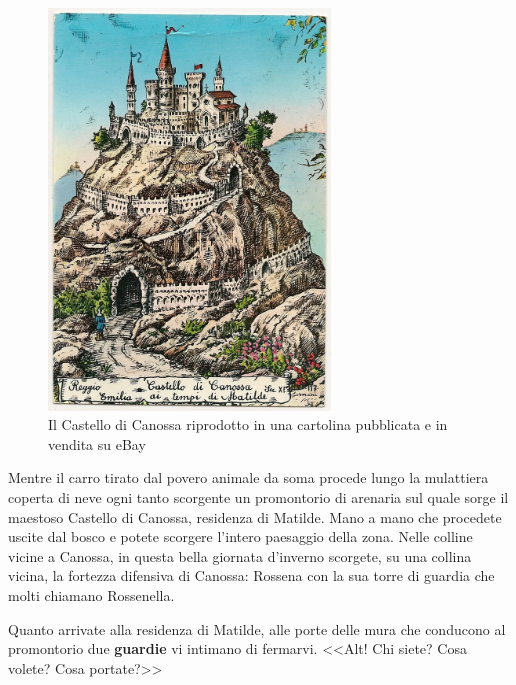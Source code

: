 \documentclass[letterpaper,twocolumn,openany,nodeprecatedcode]{dndbook}
\begin{document}
\begin{figure}
\centering
\includegraphics[width=7.5cm]{img/castello.png}
\caption{Il Castello di Canossa riprodotto in una cartolina pubblicata e in vendita su eBay}
\label{castello}
\end{figure}


\begin{DndReadAloud}
Mentre il carro tirato dal povero animale da soma procede lungo la mulattiera coperta di neve ogni tanto scorgente un promontorio di arenaria sul quale sorge il maestoso Castello di Canossa, residenza di Matilde. Mano a mano che procedete uscite dal bosco e potete scorgere l'intero paesaggio della zona. Nelle colline vicine a Canossa, in questa bella giornata d'inverno scorgete, su una collina vicina, la fortezza difensiva di Canossa: Rossena con la sua torre di guardia che molti chiamano Rossenella.

Quanto arrivate alla residenza di Matilde, alle porte delle mura che conducono al promontorio due \textbf{guardie} vi intimano di fermarvi. <<Alt! Chi siete? Cosa volete? Cosa portate?>>
\end{DndReadAloud}
\end{document}
